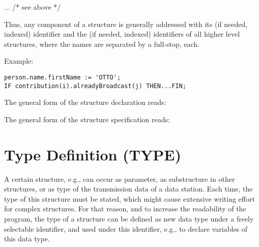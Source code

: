   ...\code{;}  /* see above */

Thus, any component of a structure is generally addressed with its (if
needed, indexed) identifier and the (if needed, indexed) identifiers of
all higher level structures, where the names are separated by a full-stop,
each.

Example:

\begin{lstlisting}
person.name.firstName := 'OTTO';
IF contribution(i).alreadyBroadcast(j) THEN...FIN;
\end{lstlisting}

The general form of the structure declaration reads:

\begin{grammarframe}








\end{grammarframe}

The general form of the structure specification reads:

\begin{grammarframe}


\end{grammarframe}

\section{Type Definition (TYPE)} %
\label{sec_type}

A certain structure, e.g., can occur as parameter, as substructure in other
structures, or as type of the transmission data of a data station.  Each
time, the type of this structure must be stated, which might cause
extensive writing effort for complex structures. For that reason, and to
increase the readability of the program, the type of a structure can be
defined as new data type under a freely selectable identifier, and used
under this identifier, e.g., to declare variables of this data type.

